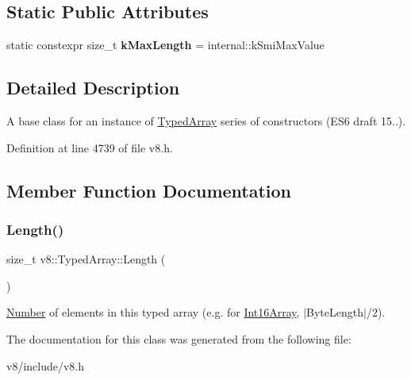 \subsection*{Static Public Attributes}
\begin{DoxyCompactItemize}
\item 
\mbox{\label{classv8_1_1TypedArray_a54a48f4373da0850663c4393d843b9b0}} 
static constexpr size\+\_\+t {\bfseries k\+Max\+Length} = internal\+::k\+Smi\+Max\+Value
\end{DoxyCompactItemize}


\subsection{Detailed Description}
A base class for an instance of \mbox{\hyperlink{classv8_1_1TypedArray}{Typed\+Array}} series of constructors (E\+S6 draft 15..). 

Definition at line 4739 of file v8.\+h.



\subsection{Member Function Documentation}
\mbox{\label{classv8_1_1TypedArray_abb1047225d53d960c0da9c9f83cd7042}} 
\subsubsection{\texorpdfstring{Length()}{Length()}}
{\footnotesize\ttfamily size\+\_\+t v8\+::\+Typed\+Array\+::\+Length (\begin{DoxyParamCaption}{ }\end{DoxyParamCaption})}

\mbox{\hyperlink{classv8_1_1Number}{Number}} of elements in this typed array (e.\+g. for \mbox{\hyperlink{classv8_1_1Int16Array}{Int16\+Array}}, $\vert$\+Byte\+Length$\vert$/2). 

The documentation for this class was generated from the following file\+:\begin{DoxyCompactItemize}
\item 
v8/include/v8.\+h\end{DoxyCompactItemize}
